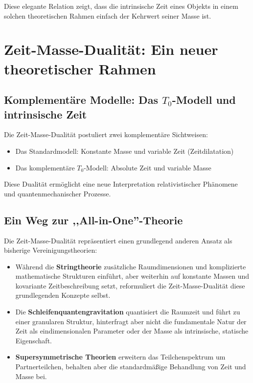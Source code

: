 \documentclass[12pt,a4paper]{article}  %
\begin{document}
	Diese elegante Relation zeigt, dass die intrinsische Zeit eines Objekts in einem solchen theoretischen Rahmen einfach der Kehrwert seiner Masse ist.
	
	\section{Zeit-Masse-Dualität: Ein neuer theoretischer Rahmen}
	
	\subsection{Komplementäre Modelle: Das $T_0$-Modell und intrinsische Zeit}
	
	Die Zeit-Masse-Dualität postuliert zwei komplementäre Sichtweisen:
	\begin{itemize}
		\item Das Standardmodell: Konstante Masse und variable Zeit (Zeitdilatation)
		\item Das komplementäre $T_0$-Modell: Absolute Zeit und variable Masse
	\end{itemize}
	
	Diese Dualität ermöglicht eine neue Interpretation relativistischer Phänomene und quantenmechanischer Prozesse.
	
	\subsection{Ein Weg zur ,,All-in-One''-Theorie}
	
	Die Zeit-Masse-Dualität repräsentiert einen grundlegend anderen Ansatz als bisherige Vereinigungstheorien:
	
	\begin{itemize}
		\item Während die \textbf{Stringtheorie} zusätzliche Raumdimensionen und komplizierte mathematische Strukturen einführt, aber weiterhin auf konstante Massen und kovariante Zeitbeschreibung setzt, reformuliert die Zeit-Masse-Dualität diese grundlegenden Konzepte selbst.
		
		\item Die \textbf{Schleifenquantengravitation} quantisiert die Raumzeit und führt zu einer granularen Struktur, hinterfragt aber nicht die fundamentale Natur der Zeit als eindimensionalen Parameter oder der Masse als intrinsische, statische Eigenschaft.
		
		\item \textbf{Supersymmetrische Theorien} erweitern das Teilchenspektrum um Partnerteilchen, behalten aber die standardmäßige Behandlung von Zeit und Masse bei.
	\end{itemize}
	
\end{document}
